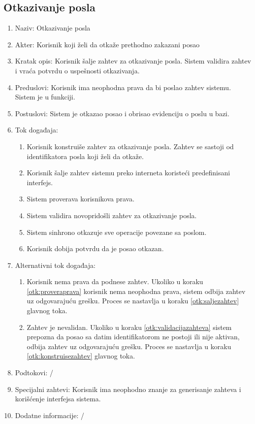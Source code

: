 \documentclass[12pt,oneside]{memoir}
\begin{document}
\subsection{Otkazivanje posla}
\begin{enumerate}
\item Naziv: Otkazivanje posla
\item Akter: Korisnik koji želi da otkaže prethodno zakazani posao
\item Kratak opis: Korisnik šalje zahtev za otkazivanje posla. Sistem validira zahtev i vraća potvrdu o uspešnosti otkazivanja.
\item Preduslovi: Korisnik ima neophodna prava da bi poslao zahtev sistemu. Sistem je u funkciji.
\item Postuslovi: Sistem je otkazao posao i obrisao evidenciju o poslu u bazi.
\item Tok događaja:
	\begin{enumerate}
	\item \label{otk:konstruisezahtev} Korisnik konstruiše zahtev za otkazivanje posla. Zahtev se sastoji od identifikatora posla koji želi da otkaže.
	\item \label{otk:saljezahtev} Korisnik šalje zahtev sistemu preko interneta koristeći predefinisani interfejs.
	\item \label{otk:proveraprava} Sistem proverava korisnikova prava.
	\item \label{otk:validacijazahteva} Sistem validira novopridošli zahtev za otkazivanje posla.
	\item \label{otk:sinhotkazivanje} Sistem sinhrono otkazuje sve operacije povezane sa poslom.
	\item Korisnik dobija potvrdu da je posao otkazan.
	\end{enumerate}
\item Alternativni tok događaja:
	\begin{enumerate}
	\item Korisnik nema prava da podnese zahtev. Ukoliko u koraku \ref{otk:proveraprava} korisnik nema neophodna prava, sistem odbija zahtev uz odgovarajuću grešku. Proces se nastavlja u koraku \ref{otk:saljezahtev} glavnog toka.
	\item Zahtev je nevalidan. Ukoliko u koraku \ref{otk:validacijazahteva} sistem prepozna da posao sa datim identifikatorom ne postoji ili nije aktivan, odbija zahtev uz odgovarajuću grešku. Proces se nastavlja u koraku \ref{otk:konstruisezahtev} glavnog toka.
	\end{enumerate}
\item Podtokovi: /
\item Specijalni zahtevi: Korisnik ima neophodno znanje za generisanje zahteva i korišćenje interfejsa sistema.
\item Dodatne informacije: /
\end{enumerate}
\end{document}
